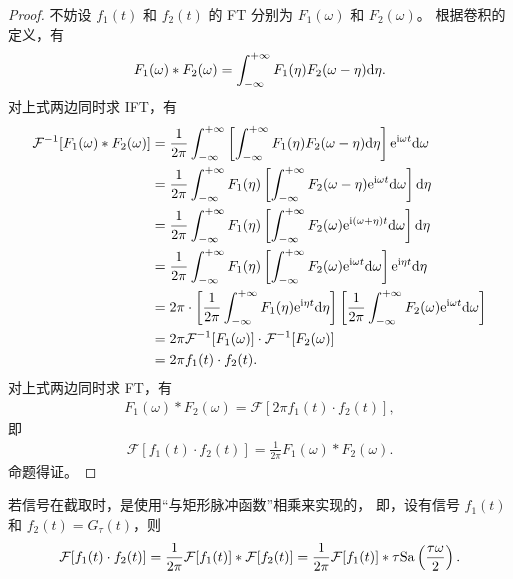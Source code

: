 \begin{proof}
    不妨设 $f_1(t)$ 和 $f_2(t)$ 的 FT 分别为 $F_1(\omega)$ 和 $F_2(\omega)$。
    根据卷积的定义，有
    \begin{align*}
        F_1(\omega) * F_2(\omega) = \int_{-\infty}^{+\infty} F_1(\eta)F_2(\omega - \eta)\mathrm{d}\eta.
    \end{align*}
    对上式两边同时求 IFT，有
    \begin{align*}
        \mathcal{F}^{-1}[F_1(\omega) * F_2(\omega)] & = \frac{1}{2\pi}\int_{-\infty}^{+\infty} \left[\int_{-\infty}^{+\infty} F_1(\eta)F_2(\omega - \eta)\mathrm{d}\eta\right]\mathrm{e}^{\mathrm{i}\omega t}\mathrm{d}\omega \\
        & = \frac{1}{2\pi}\int_{-\infty}^{+\infty} F_1(\eta)\left[\int_{-\infty}^{+\infty} F_2(\omega - \eta)\mathrm{e}^{\mathrm{i}\omega t}\mathrm{d}\omega\right]\mathrm{d}\eta \\
        & = \frac{1}{2\pi}\int_{-\infty}^{+\infty} F_1(\eta)\left[\int_{-\infty}^{+\infty} F_2(\omega)\mathrm{e}^{\mathrm{i}(\omega + \eta)t}\mathrm{d}\omega\right]\mathrm{d}\eta \\
        & = \frac{1}{2\pi}\int_{-\infty}^{+\infty} F_1(\eta)\left[\int_{-\infty}^{+\infty} F_2(\omega)\mathrm{e}^{\mathrm{i}\omega t}\mathrm{d}\omega\right]\mathrm{e}^{\mathrm{i}\eta t}\mathrm{d}\eta \\
        & = 2\pi\cdot\left[\frac{1}{2\pi}\int_{-\infty}^{+\infty} F_1(\eta)\mathrm{e}^{\mathrm{i}\eta t}\mathrm{d}\eta\right]\left[\frac{1}{2\pi}\int_{-\infty}^{+\infty} F_2(\omega)\mathrm{e}^{\mathrm{i}\omega t}\mathrm{d}\omega\right] \\
        & = 2\pi \mathcal{F}^{-1}[F_1(\omega)] \cdot \mathcal{F}^{-1}[F_2(\omega)] \\
        & = 2\pi f_1(t) \cdot f_2(t).
    \end{align*}
    对上式两边同时求 FT，有
    \begin{align*}
        F_1(\omega) * F_2(\omega) = \mathcal{F}[2\pi f_1(t) \cdot f_2(t)],
    \end{align*}
    即
    \begin{align*}
        \mathcal{F}[f_1(t) \cdot f_2(t)] = \frac{1}{2\pi}F_1(\omega) * F_2(\omega).
    \end{align*}
    命题得证。
\end{proof}

\begin{example}
    若信号在截取时，是使用“与矩形脉冲函数”相乘来实现的，
    即，设有信号 $f_1(t)$ 和 $f_2(t) = G_{\tau}(t)$，则
    \begin{align*}
        \mathcal{F}[f_1(t) \cdot f_2(t)] = \frac{1}{2\pi}\mathcal{F}[f_1(t)] * \mathcal{F}[f_2(t)] = \frac{1}{2\pi}\mathcal{F}[f_1(t)] * \tau\mathrm{Sa}\left(\frac{\tau\omega}{2}\right).
    \end{align*}
\end{example}

